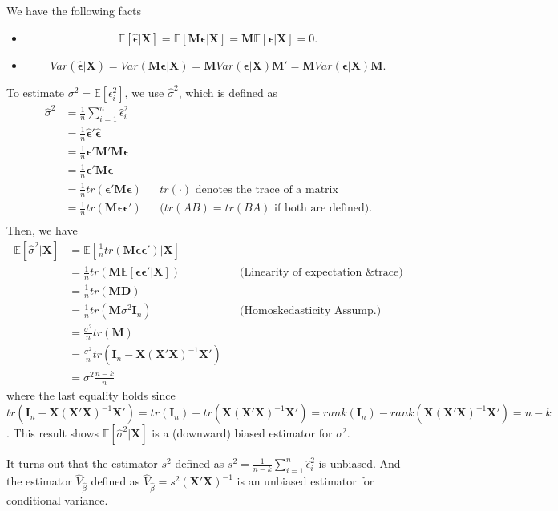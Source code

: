 \documentclass[11pt,a4paper]{amsart}
\theoremstyle{plain}
\theoremstyle{definition}
\begin{document}
	We have the following facts
	\begin{itemize}
		\item 
		\[	\mathbb{E}[\bm{\hat{\epsilon}} | \bm{X}] = \mathbb{E}[\bm{M}\bm{\epsilon} | \bm{X}] = \bm{M} \mathbb{E}[\bm{\epsilon} | \bm{X}] = 0.	\]
		\item
		\[	Var(\bm{\hat{\epsilon}} | \bm{X}) = Var(\bm{M}\bm{\epsilon} | \bm{X}) = \bm{M} Var(\bm{\epsilon}| \bm{X})\bm{M}'  =  \bm{M} Var(\bm{\epsilon}| \bm{X})\bm{M}.	\]
	\end{itemize}
	To estimate $\sigma^{2} = \mathbb{E}[\epsilon^{2}_{i}]$, we use $\hat{\sigma}^{2}$, which is defined as 
	\[	\begin{aligned}
		\hat{\sigma}^{2} &= \frac{1}{n}\sum_{i=1}^{n} \hat{\epsilon}_{i}^{2}	\\
			&= \frac{1}{n} \bm{\hat{\epsilon}}' \bm{\hat{\epsilon}} \\
			&= \frac{1}{n} \bm{\epsilon}'\bm{M}' 	\bm{M}\bm{\epsilon} \\
			&=  \frac{1}{n} \bm{\epsilon}' 	\bm{M}\bm{\epsilon} \\
			&= \frac{1}{n} tr\left(\bm{\epsilon}' 	\bm{M}\bm{\epsilon}\right)	&&\text{$tr(\cdot)$ denotes the trace of a matrix}\\
			&=  \frac{1}{n} tr\left( 	\bm{M}\bm{\epsilon}\bm{\epsilon}'\right) &&\text{($tr(AB)=tr(BA)$ if both are defined).}	\\
	\end{aligned}	\]
	Then, we have 
	\[	\begin{aligned}
		\mathbb{E}[\hat{\sigma}^{2} | \bm{X}] &= \mathbb{E}[\frac{1}{n} tr\left( 	\bm{M}\bm{\epsilon}\bm{\epsilon}'\right) | \bm{X}] \\
		&= \frac{1}{n} tr\left( \bm{M} \mathbb{E}[\bm{\epsilon}\bm{\epsilon}'| \bm{X}]\right) &&\text{(Linearity of expectation \& trace)} \\
		&=  \frac{1}{n} tr\left( \bm{M} \bm{D}\right) \\
		&= \frac{1}{n} tr\left( \bm{M} \sigma^{2} \bm{I}_{n}\right) &&\text{(Homoskedasticity Assump.)} \\
		&= \frac{\sigma^{2} }{n} tr\left( \bm{M}\right)\\
		&=  \frac{\sigma^{2} }{n} tr\left( \bm{I}_{n} - \bm{X}(\bm{X}'\bm{X})^{-1}\bm{X}' \right) \\
		&= \sigma^{2}\frac{n-k}{n}
	\end{aligned}	
	\]
	where the last equality holds since $tr\left( \bm{I}_{n} - \bm{X}(\bm{X}'\bm{X})^{-1}\bm{X}' \right) = tr\left( \bm{I}_{n} \right) - tr\left(\bm{X}(\bm{X}'\bm{X})^{-1}\bm{X}' \right) = rank(\bm{I}_{n})  - rank(\bm{X}(\bm{X}'\bm{X})^{-1}\bm{X}' )= n - k$. This result shows $	\mathbb{E}[\hat{\sigma}^{2} | \bm{X}] $ is a (downward) biased estimator for $\sigma^{2}$. \par 
	It turns out that the estimator $s^{2}$ defined as $s^{2} = \frac{1}{n-k}\sum_{i=1}^{n} \hat{\epsilon}_{i}^{2}$ is unbiased. And the estimator $\hat{V}_{\hat{\beta}}$ defined as $\hat{V}_{\hat{\beta}} = s^{2}(\bm{X}'\bm{X})^{-1}$ is an unbiased estimator for conditional variance.\par 
\end{document}
